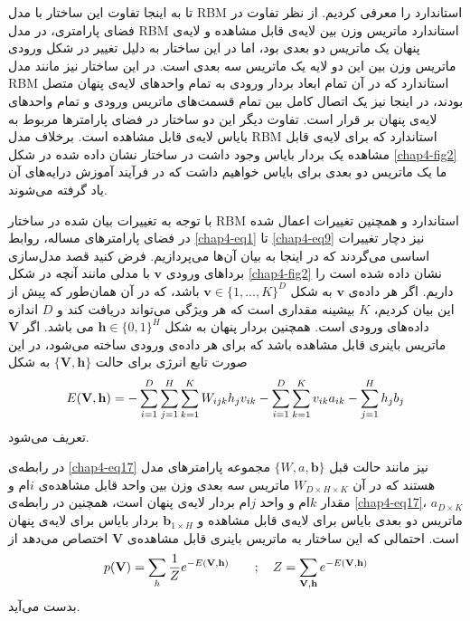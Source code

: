 تا به اینجا تفاوت این ساختار با مدل
RBM
استاندارد را معرفی‌ کردیم. از نظر تفاوت در فضای پارامتری، در مدل
RBM
استاندارد ماتریس وزن بین لایه‌ی قابل مشاهده و لایه‌ی پنهان یک ماتریس دو بعدی بود، اما در این ساختار به دلیل تغییر در شکل ورودی ماتریس وزن بین این دو لایه یک ماتریس سه بعدی است. در این ساختار نیز مانند مدل
RBM
استاندارد که در آن تمام ابعاد بردار ورودی به تمام واحد‌های لایه‌ی پنهان متصل بودند، در اینجا نیز یک اتصال کامل بین تمام قسمت‌های ماتریس ورودی و تمام واحد‌های لایه‌ی پنهان بر قرار است. تفاوت دیگر این دو ساختار در فضای پارامتر‌ها مربوط به بایاس لایه‌ی قابل مشاهده است. برخلاف مدل
RBM
استاندارد که برای لایه‌ی قابل مشاهده یک بردار بایاس وجود داشت در ساختار نشان داده شده در شکل
\ref{chap4-fig2}
ما یک ماتریس دو بعدی برای بایاس خواهیم داشت که در فرآیند آموزش درایه‌های آن یاد گرفته می‌‌شوند.

با توجه به تغییرات بیان شده در ساختار
RBM
استاندارد و همچنین تغییرات اعمال شده در فضای پارامتر‌های مساله، روابط
\ref{chap4-eq1}
تا
\ref{chap4-eq9}
نیز دچار تغییرات اساسی‌ می‌‌گردند که در اینجا به بیان آن‌ها می‌پردازیم. فرض کنید قصد مدل‌سازی بردا‌های ورودی
$\textbf{v}$
با مدلی‌ مانند آنچه در شکل
\ref{chap4-fig2}
نشان داده شده است را داریم. اگر هر داده‌ی
$\textbf{v}$
به شکل
$\textbf{v} \in \{1, ..., K\}^D$
باشد، که در آن همان‌طور که پیش از این بیان کردیم،
$K$
بیشینه مقداری است که هر ویژگی‌ می‌‌تواند دریافت کند و
$D$
اندازه داده‌های ورودی است. همچنین بردار پنهان به شکل
$\textbf{h} \in \{0,1\}^H$
می‌ باشد. اگر
$\textbf{V}$
ماتریس باینری قابل مشاهده باشد که برای هر داده‌ی ورودی ساخته می‌‌شود، در این صورت تابع انرژی برای حالت
$\{\textbf{V},\textbf{h}\}$
به شکل
\begin{align}
	\centering
	\label{chap4-eq17}
	E(\textbf{V},\textbf{h})=-\sum_{i=1}^{D}\sum_{j=1}^{H}\sum_{k=1}^{K}W_{ijk}h_jv_{ik}-\sum_{i=1}^{D}\sum_{k=1}^{K}v_{ik}a_{ik} - \sum_{j=1}^{H}h_jb_j
\end{align}
تعریف می‌‌شود.

در رابطه‌ی‌
\ref{chap4-eq17}
نیز مانند حالت قبل
$\{W, a, \textbf{b}\}$
مجموعه پارامتر‌های مدل هستند که در آن
$W_{D \times H \times K}$
ماتریس سه‌ بعدی وزن بین واحد قابل مشاهده‌ی
$i$ام
 و مقدار
$k$ام
 و واحد
$j$ام 
بردار لایه‌ی پنهان است، همچنین در رابطه‌ی
\ref{chap4-eq17}، $a_{D \times K}$
ماتریس دو بعدی بایاس برای لایه‌ی قابل مشاهده و
$\textbf{b}_{1 \times H}$
بردار بایاس برای لایه‌ی پنهان است. احتمالی‌ که این ساختار به ماتریس باینری قابل مشاهده‌ی
$\textbf{V}$
اختصاص می‌‌دهد از
 \begin{align}
 	\centering
 	\label{chap4-eq18}
 	p(\textbf{V}) = \sum_{h} \dfrac{1}{Z} e^{-E(\textbf{V},\textbf{h})} \quad\quad ; \quad
 	Z = \sum_{\textbf{V},\textbf{h}} e^{-E(\textbf{V},\textbf{h})} 
 \end{align}
 بدست می‌‌آید.


